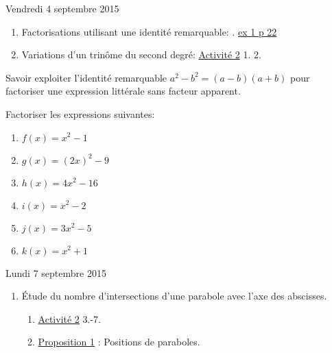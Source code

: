 \documentclass[a4paper,11pt]{article}
\theoremstyle{break}
\begin{document}
  Vendredi 4 septembre 2015
  \begin{enumerate}
    \item Factorisations utilisant une identité remarquable: .
    \href{https://github.com/mathlorgues/math1sd1516/blob/master/20150904/1-2-3p22.png}
    {ex 1 p 22}
    \item Variations d'un trinôme du second degré:
    \href{https://github.com/mathlorgues/math1sd1516/blob/master/20150904/activite.pdf}
    {Activité 2}
    1. 2.
    
  \end{enumerate}
  
  \begin{Dev}
    
    Savoir exploiter l'identité remarquable $a^2-b^2=(a-b)(a+b)$ pour factoriser 
    une expression littérale sans facteur apparent.
    
    \begin{exo}
      
      Factoriser les expressions suivantes:
      \begin{enumerate}
	\item $f(x)=x^2-1$
	\item $g(x)=(2x)^2-9$
	\item $h(x)=4x^2-16$
	\item $i(x)=x^2-2$
	\item $j(x)=3x^2-5$
	\item $k(x)=x^2+1$
      \end{enumerate}
      
      
    \end{exo}
    
    
  \end{Dev}
  
  \newpage
  
  Lundi 7 septembre 2015
  \begin{enumerate}
    
    \item \'Etude du nombre d'intersections d'une parabole avec l'axe des abscisses.
    \begin{enumerate}
      \item 
      \href{https://github.com/mathlorgues/math1sd1516/blob/master/20150907/activite.pdf}
      {Activité 2} 3.-7.
      \item 
      \href{https://github.com/mathlorgues/math1sd1516/blob/master/20150907/propositions.pdf}
      {Proposition 1} : Positions de paraboles.
      
    \end{enumerate}
    
    
  \end{enumerate}
  
\end{document}
